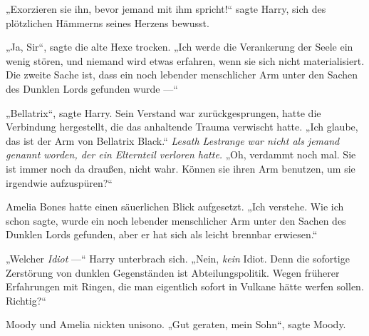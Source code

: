 „Exorzieren sie ihn, bevor jemand mit ihm spricht!“ sagte Harry, sich des plötzlichen Hämmerns seines Herzens bewusst.

„Ja, Sir“, sagte die alte Hexe trocken.
„Ich werde die Verankerung der Seele ein wenig stören, und niemand wird etwas erfahren, wenn sie sich nicht materialisiert. Die zweite Sache ist, dass ein noch lebender menschlicher Arm unter den Sachen des Dunklen Lords gefunden wurde —“

„Bellatrix“, sagte Harry.
Sein Verstand war zurückgesprungen, hatte die Verbindung hergestellt, die das anhaltende Trauma verwischt hatte.
„Ich glaube, das ist der Arm von Bellatrix Black.“
\emph{Lesath Lestrange war nicht als jemand genannt worden, der ein Elternteil verloren hatte.}
„Oh, verdammt noch mal. Sie ist immer noch da draußen, nicht wahr. Können sie ihren Arm benutzen, um sie irgendwie aufzuspüren?“

Amelia Bones hatte einen säuerlichen Blick aufgesetzt.
„Ich verstehe. Wie ich schon sagte, wurde ein noch lebender menschlicher Arm unter den Sachen des Dunklen Lords gefunden, aber er hat sich als leicht brennbar erwiesen.“

„Welcher \emph{Idiot} —“
Harry unterbrach sich.
„Nein, \emph{kein} Idiot. Denn die sofortige Zerstörung von dunklen Gegenständen ist Abteilungspolitik. Wegen früherer Erfahrungen mit Ringen, die man eigentlich sofort in Vulkane hätte werfen sollen. Richtig?“

Moody und Amelia nickten unisono.
„Gut geraten, mein Sohn“, sagte Moody.

